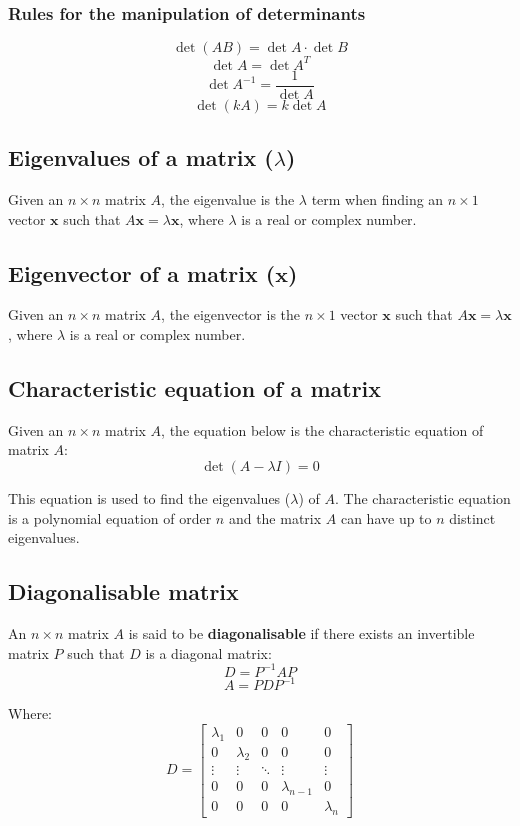 \documentclass[11pt]{article}
\begin{document}
\subsubsection{Rules for the manipulation of determinants}
\label{sec:org8a0e365}
\[\det (AB) = \det A \cdot \det B\]
\[\det A = \det A^T\]
\[\det A^{-1} = \frac{1}{\det A}\]
\[\det (kA) = k \det A\]
\subsection{Eigenvalues of a matrix (\(\lambda\))}
\label{sec:org27641ac}
Given an \(n \times n\) matrix \(A\), the eigenvalue is the \(\lambda\) term when finding an \(n \times 1\) vector \(\boldsymbol{x}\) such that \(A \boldsymbol{x} = \lambda \boldsymbol{x}\), where \(\lambda\) is a real or complex number.
\subsection{Eigenvector of a matrix (\(\boldsymbol{x}\))}
\label{sec:org61680b2}
Given an \(n \times n\) matrix \(A\), the eigenvector is the \(n \times 1\) vector \(\boldsymbol{x}\) such that \(A \boldsymbol{x} = \lambda \boldsymbol{x}\), where \(\lambda\) is a real or complex number.
\subsection{Characteristic equation of a matrix}
\label{sec:org09e67ad}
Given an \(n \times n\) matrix \(A\), the equation below is the characteristic equation of matrix \(A\):
\[\det (A - \lambda I) = 0\]

This equation is used to find the eigenvalues (\(\lambda\)) of \(A\). The characteristic equation is a polynomial equation of order \(n\) and the matrix \(A\) can have up to \(n\) distinct eigenvalues.
\subsection{Diagonalisable matrix}
\label{sec:orgaf8a05c}
An \(n \times n\) matrix \(A\) is said to be \textbf{diagonalisable} if there exists an invertible matrix \(P\) such that \(D\) is a diagonal matrix:
\[D = P^{-1} A P\]
\[A = PDP^{-1}\]

Where:
\begin{displaymath}
D = \begin{bmatrix}
\lambda_1 & 0 & 0 & 0 & 0 \\
0 & \lambda_2 & 0 & 0 & 0 \\
\vdots & \vdots & \ddots & \vdots & \vdots \\
0 & 0 & 0 & \lambda_{n-1} & 0 \\
0 & 0 & 0 & 0 & \lambda_{n}
\end{bmatrix}
\end{displaymath}
\end{document}
